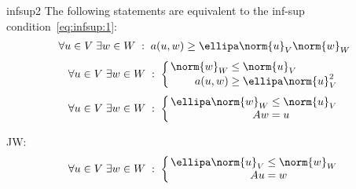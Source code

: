 \begin{Lemma}{infsup2}
  The following statements are equivalent to the inf-sup
  condition~\eqref{eq:infsup:1}:
  \begin{gather}
    \label{eq:infsup:2}
    \forall u\in V \;\exists w\in W \;:\; a(u,w) \ge \ellipa \norm{u}_V\norm{w}_W
  \end{gather}
  \begin{gather}
    \label{eq:infsup:3}
    \forall u\in V
    \;\exists w\in W \;:\;
    \left\{
    \arraycolsep0.3ex
    \begin{array}{rcl}
      \norm{w}_W &\le&\norm{u}_V\\
      a(u,w) &\ge& \ellipa \norm{u}_V^2
    \end{array}
    \right.
  \end{gather}
  \begin{gather}
    \label{eq:infsup:3a}
    \forall u\in V
    \;\exists w\in W \;:\;
    \left\{
    \arraycolsep0.3ex
    \begin{array}{rcl}
      \ellipa \norm{w}_W &\le&\norm{u}_V\\
      Aw &=& u
    \end{array}
    \right.
  \end{gather}
  \begin{todo}
    JW:
  \begin{gather}
    \forall u\in V
    \;\exists w\in W \;:\;
    \left\{
    \arraycolsep0.3ex
    \begin{array}{rcl}
      \ellipa \norm{u}_V &\le&\norm{w}_W\\
      Au &=& w
    \end{array}
    \right.
  \end{gather}
  \end{todo}
\end{Lemma}

